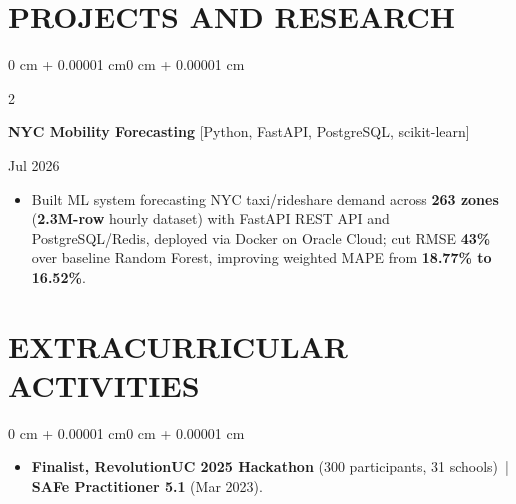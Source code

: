 \documentclass[10pt, letterpaper]{article}
\newenvironment{highlights}{
    \begin{itemize}[
        topsep=0.10 cm,
        parsep=0.06 cm,
        partopsep=0pt,
        itemsep=0.06 cm,
        leftmargin=12pt
    ]
}{
    \end{itemize}
}
\newenvironment{onecolentry}{
    \begin{adjustwidth}{0 cm + 0.00001 cm}{0 cm + 0.00001 cm}
}{
    \end{adjustwidth}
}
\newenvironment{twocolentry}[2][]{
    \onecolentry
    \def\secondColumn{#2}
    \setcolumnwidth{\fill, 4.5 cm}
    \begin{paracol}{2}
}{
    \switchcolumn \raggedleft \secondColumn
    \end{paracol}
    \endonecolentry
}
\begin{document}
\section{PROJECTS AND RESEARCH}
\begin{twocolentry}{Jul 2026}
\textbf{NYC Mobility Forecasting} [Python, FastAPI, PostgreSQL, scikit-learn]
\end{twocolentry}
\begin{highlights}
  \item Built ML system forecasting NYC taxi/rideshare demand across \textbf{263 zones} (\textbf{2.3M-row} hourly dataset) with FastAPI REST API and PostgreSQL/Redis, deployed via Docker on Oracle Cloud; cut RMSE \textbf{43\%} over baseline Random Forest, improving weighted MAPE from \textbf{18.77\% to 16.52\%}.
\end{highlights}

\section{EXTRACURRICULAR ACTIVITIES}
\begin{onecolentry}
\begin{highlights}
  \item \textbf{Finalist, RevolutionUC 2025 Hackathon} (300 participants, 31 schools) \,|\, \textbf{SAFe Practitioner 5.1} (Mar 2023).
\end{highlights}
\end{onecolentry}
\end{document}
